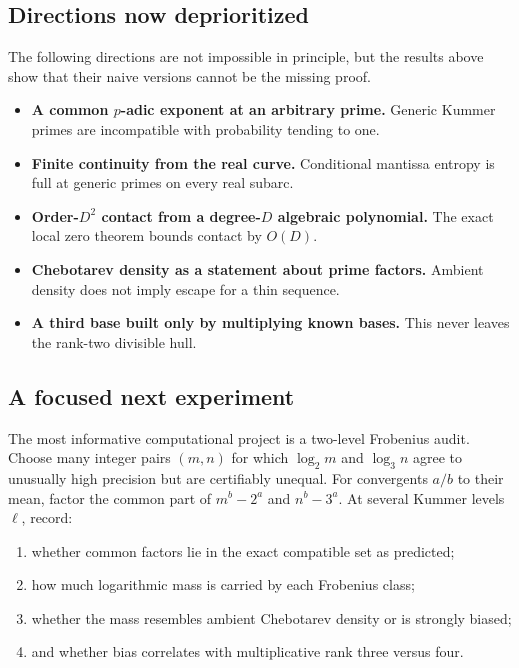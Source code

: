 \documentclass[11pt,oneside]{article}
\theoremstyle{definition}
\theoremstyle{remark}
\begin{document}
\subsection{Directions now deprioritized}

The following directions are not impossible in principle, but the results
above show that their naive versions cannot be the missing proof.

\begin{itemize}
\item \textbf{A common $p$-adic exponent at an arbitrary prime.}  Generic
Kummer primes are incompatible with probability tending to one.
\item \textbf{Finite continuity from the real curve.}  Conditional mantissa
entropy is full at generic primes on every real subarc.
\item \textbf{Order-$D^2$ contact from a degree-$D$ algebraic polynomial.}
The exact local zero theorem bounds contact by $O(D)$.
\item \textbf{Chebotarev density as a statement about prime factors.}
Ambient density does not imply escape for a thin sequence.
\item \textbf{A third base built only by multiplying known bases.}  This
never leaves the rank-two divisible hull.
\end{itemize}

\subsection{A focused next experiment}

The most informative computational project is a two-level Frobenius audit.
Choose many integer pairs $(m,n)$ for which
$\log_2 m$ and $\log_3 n$ agree to unusually high precision but are
certifiably unequal.  For convergents $a/b$ to their mean, factor the common
part of $m^b-2^a$ and $n^b-3^a$.  At several Kummer levels $\ell$, record:

\begin{enumerate}
\item whether common factors lie in the exact compatible set as predicted;
\item how much logarithmic mass is carried by each Frobenius class;
\item whether the mass resembles ambient Chebotarev density or is strongly
      biased;
\item and whether bias correlates with multiplicative rank three versus four.
\end{enumerate}
\end{document}
